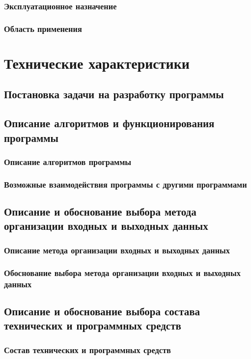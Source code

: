 \documentclass[a4paper,12pt]{article}
\begin{document}
	\subsubsection{Эксплуатационное назначение}
	\subsubsection{Область применения}
	
					\newpage 
	\section{Технические характеристики}
	\subsection{Постановка задачи на разработку программы}
	\subsection{Описание алгоритмов и функционирования программы}
	\subsubsection{Описание алгоритмов программы}
	\subsubsection{Возможные взаимодействия программы с другими программами}
	\subsection{Описание и обоснование выбора метода организации входных и выходных данных}
	\subsubsection{Описание метода организации входных и выходных данных}
	\subsubsection{Обоснование выбора метода организации входных и выходных данных}
	\subsection{Описание и обоснование выбора состава технических и программных средств}
	\subsubsection{Состав технических и программных средств}
\end{document}
